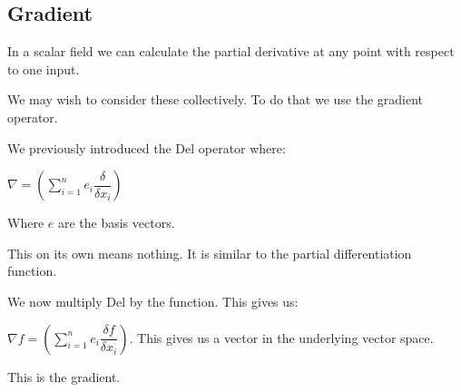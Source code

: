 
\subsection{Gradient}

In a scalar field we can calculate the partial derivative at any point with respect to one input.

We may wish to consider these collectively. To do that we use the gradient operator.

We previously introduced the Del operator where:

\(\nabla =(\sum_{i=1}^n e_i\dfrac{\delta }{\delta x_i})\)

Where \(e\) are the basis vectors.

This on its own means nothing. It is similar to the partial differentiation function.

We now multiply Del by the function. This gives us:

\(\nabla f=(\sum_{i=1}^n e_i\dfrac{\delta f}{\delta x_i})\). This gives us a vector in the underlying vector space.

This is the gradient.

